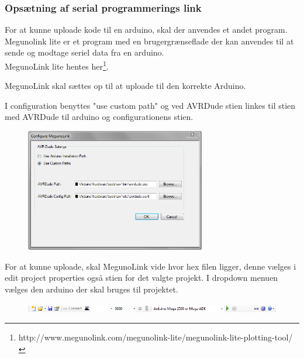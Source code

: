 \newpage

\subsubsection*{Opsætning af serial programmerings link}

For at kunne uploade kode til en arduino, skal der anvendes et andet program.
Megunolink lite er et program med en brugergrænseflade der kan anvendes til at sende og modtage seriel data fra en arduino.\\
MegunoLink lite hentes her\footnote{http://www.megunolink.com/megunolink-lite/megunolink-lite-plotting-tool/}.

MegunoLink skal sættes op til at uploade til den korrekte Arduino. 

I configuration benyttes "use custom path" og ved AVRDude stien linkes til stien med AVRDude til arduino og configurationens stien. 

\begin{figure}[H]
	\centering
	\includegraphics[width=0.7\textwidth]{Billeder/implementation/Howtoguide/megunolink_config.png}
\end{figure}

For at kunne uploade, skal MegunoLink vide hvor hex filen ligger, denne vælges i edit project properties også stien for det valgte projekt.
I dropdown menuen vælges den arduino der skal bruges til projektet.
\begin{figure}[H]
	\centering
	\includegraphics[width=1\textwidth]{Billeder/implementation/Howtoguide/meguno_bar.png}
\end{figure}






